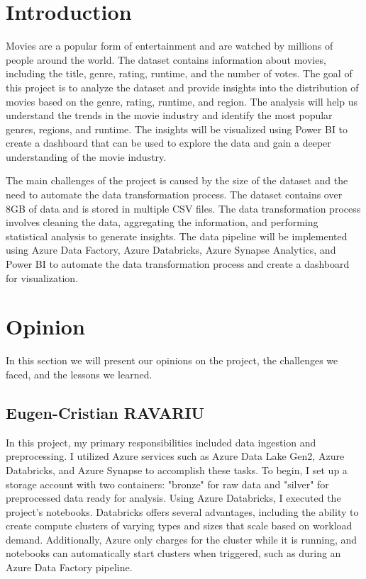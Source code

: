 \documentclass[a4paper,12pt]{article}
\begin{document}
\newpage
\tableofcontents  %
\newpage

\section{Introduction}
\label{sec:introduction}

Movies are a popular form of entertainment and are watched by millions of people around the world. 
The dataset contains information about movies, including the title, genre, rating, runtime, and the 
number of votes. The goal of this project is to analyze the dataset and provide insights into the 
distribution of movies based on the genre, rating, runtime, and region. The analysis will help us 
understand the trends in the movie industry and identify the most popular genres, regions, and runtime. 
The insights will be visualized using Power BI to create a dashboard that can be used to explore the 
data and gain a deeper understanding of the movie industry.

The main challenges of the project is caused by the size of the dataset and the need to automate 
the data transformation process. The dataset contains over 8GB of data and is stored in multiple 
CSV files. The data transformation process involves cleaning the data, aggregating the information, 
and performing statistical analysis to generate insights. The data pipeline will be implemented using 
Azure Data Factory, Azure Databricks, Azure Synapse Analytics, and Power BI to automate the data 
transformation process and create a dashboard for visualization.

\section{Opinion}
\label{sec:opinion}

In this section we will present our opinions on the project, the challenges we faced, and the lessons we learned.

\subsection{Eugen-Cristian RAVARIU}

In this project, my primary responsibilities included data ingestion and preprocessing. I utilized Azure services such as Azure Data Lake Gen2, Azure Databricks, and Azure Synapse to accomplish these tasks.
To begin, I set up a storage account with two containers: "bronze" for raw data and "silver" for preprocessed data ready for analysis. Using Azure Databricks, I executed the project's notebooks. 
Databricks offers several advantages, including the ability to create compute clusters of varying types and sizes that scale based on workload demand. 
Additionally, Azure only charges for the cluster while it is running, and notebooks can automatically start clusters when triggered, such as during an Azure Data Factory pipeline.
\end{document}
